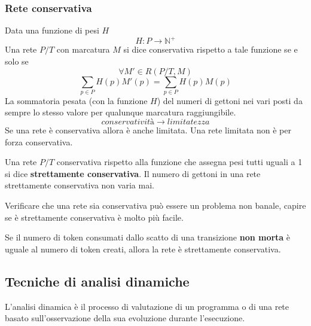 \documentclass[12pt, twoside, letterpaper]{article}
\begin{document}
			\subsubsection{Rete conservativa}
				Data una funzione di pesi $H$ $$H: P \rightarrow \mathbb{N}^+$$
				Una rete $P/T$ con marcatura $M$ si dice conservativa rispetto a tale funzione se e solo se 
				$$\forall M' \in R(P/T,M)$$
				$$\sum_{p \in P} H(p)M'(p) = \sum_{p \in P} H(p)M(p)$$
				La sommatoria pesata (con la funzione $H$) del numeri di gettoni nei vari posti da sempre lo stesso valore per qualunque marcatura raggiungibile.
								$$conservativit\textit{à} \rightarrow limitatezza$$
				Se una rete è conservativa allora è anche limitata. Una rete limitata non è per forza conservativa.
				
				Una rete $P/T$ conservativa rispetto alla funzione che assegna pesi tutti uguali a 1 si dice \textbf{strettamente conservativa}. Il numero di gettoni in una rete strettamente conservativa non varia mai.
				
				Verificare che una rete sia conservativa può essere un problema non banale, capire se è strettamente conservativa è molto più facile. 
				
				Se il numero di token consumati dallo scatto di una transizione \textbf{non morta} è uguale al numero di token creati, allora la rete è strettamente conservativa.
		
		\subsection{Tecniche di analisi dinamiche}
			L'analisi dinamica è il processo di valutazione di un programma o di una rete basato sull'osservazione della sua evoluzione durante l'esecuzione.
\end{document}
